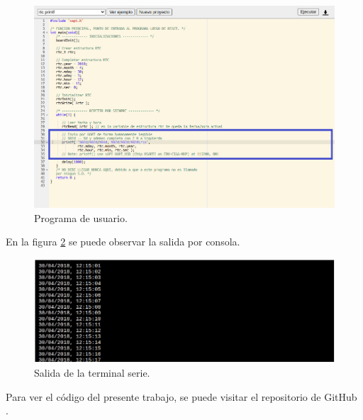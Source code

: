 \begin{figure}[ht]
	\centering
	\includegraphics[scale=.41]{./Figures/Terminal1.png}
	\caption{Programa de usuario.}
	\label{fig:Terminal1}
\end{figure}
 


En la figura \ref{fig:Terminal2} se puede observar la salida por consola.

\begin{figure}[ht]
	\centering
	\includegraphics[scale=.45]{./Figures/Terminal2.png}
	\caption{Salida de la terminal serie.}
	\label{fig:Terminal2}
\end{figure}
 
 
Para ver el código del presente trabajo, se puede visitar el repositorio de GitHub \citep{repositorioEmulador}.



